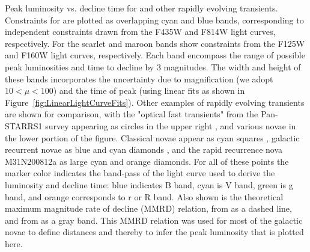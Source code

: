 Peak luminosity vs. decline time for \spock and other rapidly evolving transients.  Constraints for \spockone are plotted as overlapping cyan and blue bands, corresponding to independent constraints drawn from the F435W and F814W light curves, respectively.  For \spocktwo the scarlet and maroon bands show constraints from the F125W and F160W light curves, respectively.  Each band encompass the range of possible peak luminosities and time to decline by 3 magnitudes. The width and height of these bands incorporates the uncertainty due to magnification (we adopt $10<\mu<100$) and the time of peak (using linear fits as shown in Figure~\ref{fig:LinearLightCurveFits}).   Other examples of rapidly evolving transients are shown for comparison, with the "optical fast transients" from the Pan-STARRS1 survey appearing as circles in the upper right \citep{Drout:2014a}, and various novae in the lower portion of the figure. Classical novae appear as cyan squares \citep{Downes:2000}, galactic recurrent novae as blue and cyan diamonds \citep{Schaefer:2010}, and the rapid recurrence nova M31N200812a as large cyan and orange diamonds.  For all of these points the marker color indicates the band-pass of the light curve used to derive the luminosity and decline time: blue indicates B band, cyan is V band, green is g band, and orange corresponds to r or R band.  Also shown is the theoretical maximum magnitude rate of decline (MMRD) relation, from \citep{Livio:1992} as a dashed line, and from \citep{Downes:2000} as a gray band. This MMRD relation was used for most of the galactic novae to define distances and thereby to infer the peak luminosity that is plotted here.